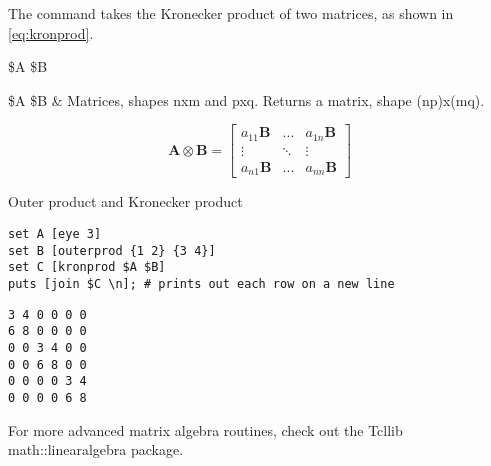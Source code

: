 The command  takes the Kronecker product of two matrices, as shown in \eq\eqref{eq:kronprod}.
\begin{syntax}
 \$A \$B
\end{syntax}
\begin{args}
\$A \$B & Matrices, shapes nxm and pxq. Returns a matrix, shape (np)x(mq).
\end{args}
\begin{equation}\label{eq:kronprod}
\bm{A} \otimes \bm{B} = \left[\begin{matrix}
a_{11}\bm{B} & ... & a_{1n}\bm{B} \\
\vdots & \ddots & \vdots \\
a_{n1}\bm{B} & ... & a_{nn}\bm{B}
\end{matrix}\right]
\end{equation}
\begin{example}{Outer product and Kronecker product}
\begin{lstlisting}
set A [eye 3]
set B [outerprod {1 2} {3 4}]
set C [kronprod $A $B]
puts [join $C \n]; # prints out each row on a new line
\end{lstlisting}
\tcblower
\begin{lstlisting}
3 4 0 0 0 0
6 8 0 0 0 0
0 0 3 4 0 0
0 0 6 8 0 0
0 0 0 0 3 4
0 0 0 0 6 8
\end{lstlisting}
\end{example}
For more advanced matrix algebra routines, check out the Tcllib math::linearalgebra package.
\clearpage
